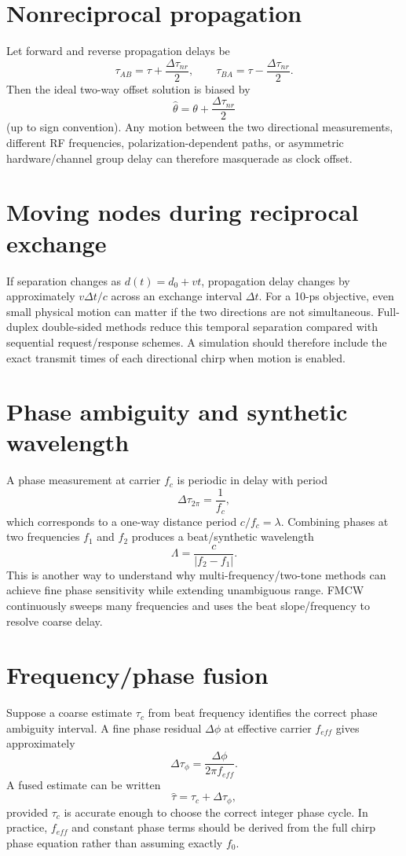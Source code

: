 \documentclass[11pt]{article}
\begin{document}
\section{Nonreciprocal propagation}
Let forward and reverse propagation delays be
\[
\tau_{AB}=\tau+\frac{\Delta\tau_{nr}}{2},\qquad
\tau_{BA}=\tau-\frac{\Delta\tau_{nr}}{2}.
\]
Then the ideal two-way offset solution is biased by
\[
\hat\theta=\theta+\frac{\Delta\tau_{nr}}{2}
\]
(up to sign convention). Any motion between the two directional measurements, different RF frequencies, polarization-dependent paths, or asymmetric hardware/channel group delay can therefore masquerade as clock offset.

\section{Moving nodes during reciprocal exchange}
If separation changes as $d(t)=d_0+vt$, propagation delay changes by approximately $v\Delta t/c$ across an exchange interval $\Delta t$. For a 10-ps objective, even small physical motion can matter if the two directions are not simultaneous. Full-duplex double-sided methods reduce this temporal separation compared with sequential request/response schemes. A simulation should therefore include the exact transmit times of each directional chirp when motion is enabled.

\section{Phase ambiguity and synthetic wavelength}
A phase measurement at carrier $f_c$ is periodic in delay with period
\[
\Delta\tau_{2\pi}=\frac{1}{f_c},
\]
which corresponds to a one-way distance period $c/f_c=\lambda$. Combining phases at two frequencies $f_1$ and $f_2$ produces a beat/synthetic wavelength
\[
\Lambda=\frac{c}{|f_2-f_1|}.
\]
This is another way to understand why multi-frequency/two-tone methods can achieve fine phase sensitivity while extending unambiguous range. FMCW continuously sweeps many frequencies and uses the beat slope/frequency to resolve coarse delay.

\section{Frequency/phase fusion}
Suppose a coarse estimate $\tau_c$ from beat frequency identifies the correct phase ambiguity interval. A fine phase residual $\Delta\phi$ at effective carrier $f_{eff}$ gives approximately
\[
\Delta\tau_\phi=\frac{\Delta\phi}{2\pi f_{eff}}.
\]
A fused estimate can be written
\[
\hat\tau=\tau_c+\Delta\tau_\phi,
\]
provided $\tau_c$ is accurate enough to choose the correct integer phase cycle. In practice, $f_{eff}$ and constant phase terms should be derived from the full chirp phase equation rather than assuming exactly $f_0$.
\end{document}
